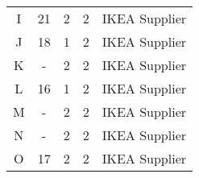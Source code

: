 \documentclass[oneside,12pt]{article}%
\begin{document}
\begin{table}[h]
{\begin{tabular}{c|c|ccc}
    I        & 21     & 2           & 2                                                          & IKEA Supplier                                                                  \\
    J        & 18     & 1           & 2                                                          & IKEA Supplier                                                                  \\
    K        & -      & 2           & 2                                                          & IKEA Supplier                                                                  \\
    L        & 16     & 1           & 2                                                          & IKEA Supplier                                                                  \\
    M        & -      & 2           & 2                                                          & IKEA Supplier                                                                  \\
    N        & -      & 2           & 2                                                          & IKEA Supplier                                                                  \\
    O        & 17     & 2           & 2                                                          & IKEA Supplier
  \end{tabular}
  }
\end{table}
\end{document}
